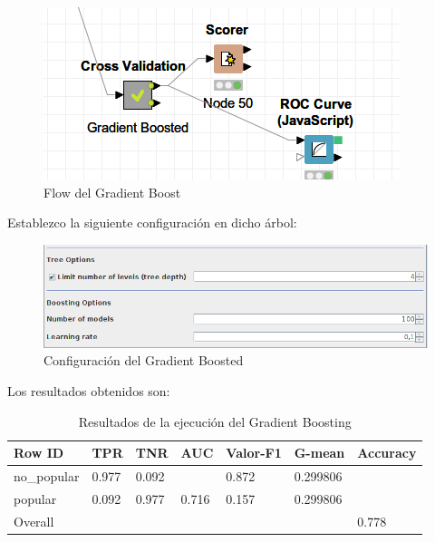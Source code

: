 \begin{figure}[H] %
	\centering
	\includegraphics[scale=0.4]{flow-gb-p.png}  %
	\caption{Flow del Gradient Boost} 
	\label{fig:flow-gb}
\end{figure}

Establezco la siguiente configuración en dicho árbol:

\begin{figure}[H] %
	\centering
	\includegraphics[scale=0.4]{conf-gb-p.png}  %
	\caption{Configuración del Gradient Boosted} 
	\label{fig:conf-gb}
\end{figure}

Los resultados obtenidos son:

\begin{table}[H]
	\centering
	\begin{tabular}{|l|l|l|l|l|l|l|}
		\hline
		Row ID      & TPR   & TNR   & AUC   & Valor-F1 & G-mean   & Accuracy \\ \hline
		no\_popular & 0.977 & 0.092 &       & 0.872    & 0.299806 &          \\ \hline
		popular     & 0.092 & 0.977 & 0.716 & 0.157    & 0.299806 &          \\ \hline
		Overall     &       &       &       &          &          & 0.778    \\ \hline
	\end{tabular}
	\caption{Resultados de la ejecución del Gradient Boosting}
	\label{tab:gb}
\end{table}

